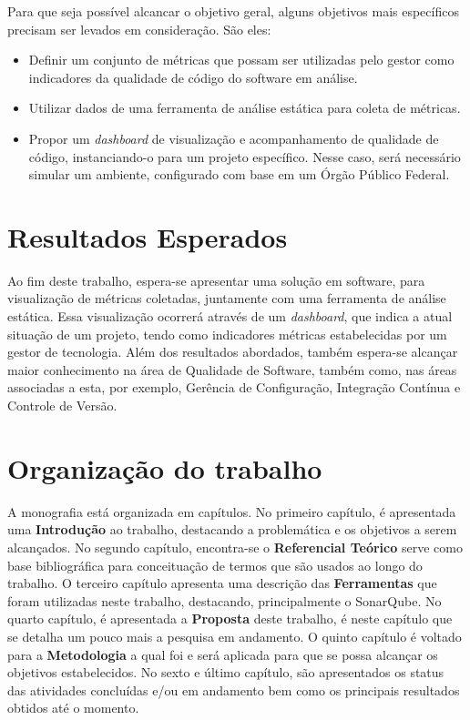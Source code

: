 	Para que seja possível alcancar o objetivo geral, alguns objetivos mais específicos precisam ser levados em consideração. São eles:
		
	\begin{itemize}
		\item Definir um conjunto de métricas que possam ser utilizadas pelo gestor como indicadores da qualidade de código do software em análise.
		\item Utilizar dados de uma ferramenta de análise estática para coleta de métricas. 
		\item Propor um \textit{dashboard} de visualização e acompanhamento de qualidade de código, instanciando-o para um projeto específico. Nesse caso, será necessário simular um ambiente, configurado com base em um Órgão Público Federal.
		
	\end{itemize}
	
	
	\section{Resultados Esperados}

Ao fim deste trabalho, espera-se apresentar uma solução em software, para visualização de métricas coletadas,  juntamente com uma ferramenta de análise estática. Essa visualização ocorrerá através de um \textit{dashboard}, que indica a atual situação de um projeto, tendo como indicadores métricas estabelecidas por um gestor de tecnologia.
Além dos resultados abordados, também espera-se alcançar maior conhecimento na área de Qualidade de Software, também como, nas áreas associadas a esta, por exemplo, Gerência de Configuração, Integração Contínua e Controle de Versão.

	\section{Organização do trabalho} %
	\label{sec:organização_do_trabalho} 	
A monografia está organizada em capítulos. No primeiro capítulo, é apresentada uma \textbf{Introdução} ao trabalho, destacando a problemática e os objetivos a serem alcançados. No segundo capítulo, encontra-se o \textbf{Referencial Teórico} serve como base bibliográfica para conceituação de termos que são usados ao longo do trabalho. O terceiro capítulo apresenta uma descrição das \textbf{Ferramentas} que foram utilizadas neste trabalho, destacando, principalmente o SonarQube. No quarto capítulo, é apresentada a \textbf{Proposta} deste trabalho, é neste capítulo que se detalha um pouco mais a pesquisa em andamento. O quinto capítulo é voltado para a \textbf{Metodologia} a qual foi e será aplicada para que se possa alcançar os objetivos estabelecidos. No sexto e último capítulo, são apresentados os status das atividades concluídas e/ou em andamento bem como os principais resultados obtidos até o momento.